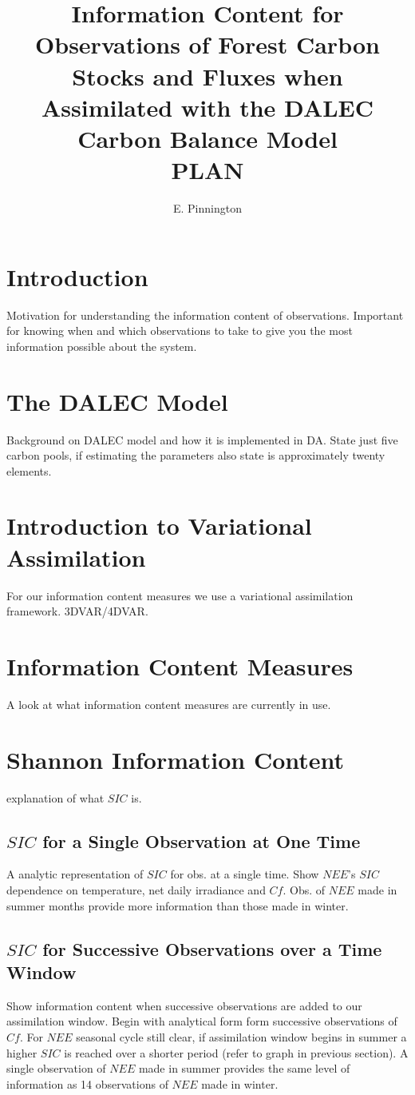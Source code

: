 \documentclass[11pt]{article}
\title{Information Content for Observations of Forest Carbon Stocks and Fluxes when Assimilated with the DALEC Carbon Balance Model \\ PLAN}
\author{\normalsize{E. Pinnington}}
\begin{document}
\maketitle

\section*{Introduction}
Motivation for understanding the information content of observations. Important for knowing when and which observations to take to give you the most information possible about the system.  

\section*{The DALEC Model}
Background on DALEC model and how it is implemented in DA. State just five carbon pools, if estimating the parameters also state is approximately twenty elements.

\section*{Introduction to Variational Assimilation}
For our information content measures we use a variational assimilation framework. 3DVAR/4DVAR.

\section*{Information Content Measures}
A look at what information content measures are currently in use.

\section*{Shannon Information Content}
explanation of what $SIC$ is.
\subsection*{$SIC$ for a Single Observation at One Time}
A analytic representation of $SIC$ for obs. at a single time. Show $NEE$'s $SIC$ dependence on temperature, net daily irradiance and $Cf$. Obs. of $NEE$ made in summer months provide more information than those made in winter. 
\subsection*{$SIC$ for Successive Observations over a Time Window}
Show information content when successive observations are added to our assimilation window. Begin with analytical form form successive observations of $Cf$. For $NEE$ seasonal cycle still clear, if assimilation window begins in summer a higher $SIC$ is reached over a shorter period (refer to graph in previous section). A single observation of $NEE$ made in summer provides the same level of information as 14 observations of $NEE$ made in winter.
\end{document}
